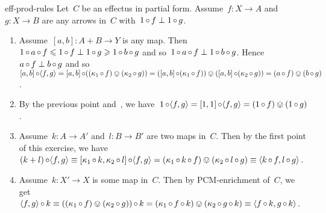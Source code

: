 \begin{solution}{eff-prod-rules}%
   Let~$C$ be an effectus in partial form.
Assume~$f\colon X \to A$ and~$g\colon X \to B$
    are any arrows in~$C$ with~$1 \mathop{\circ} f \perp 1 \mathop{\circ} g$.
\begin{enumerate}
\item Assume~$[a,b]\colon A+B \to Y$ is any map.
Then~$1 \mathop{\circ} a \mathop{\circ} f \leqslant 1 \mathop{\circ} f \perp 1 \mathop{\circ} g
        \geqslant 1 \mathop{\circ} b \mathop{\circ} g$
        and so~$1 \mathop{\circ} a \mathop{\circ} f \perp 1 \mathop{\circ} b \mathop{\circ} g$.
    Hence~$a \mathop{\circ} f \perp b \mathop{\circ} g$
    and so~$[a,b] \mathop{\circ} \langle f, g \rangle
        = [a,b] \mathop{\circ} ((\kappa_1 \mathop{\circ} f) \ovee (\kappa_2 \mathop{\circ} g))
        = ([a,b] \mathop{\circ} (\kappa_1 \mathop{\circ} f)) \ovee ([a,b] \mathop{\circ} (\kappa_2 \mathop{\circ} g)) = (a \mathop{\circ} f) \ovee (b \mathop{\circ} g)$.
\item By the previous point and~,
        we have~$1 \mathop{\circ} \langle f,g\rangle
            = [1,1] \mathop{\circ} \langle f,g\rangle
            = (1 \mathop{\circ} f) \ovee (1 \mathop{\circ} g)$.
\item Assume~$k\colon A \to A'$ and~$l \colon B \to B'$ are two maps in~$C$.
    Then by the first point of this exercise,
            we have~$(k+l) \mathop{\circ} \langle f, g\rangle
                \equiv [\kappa_1 \mathop{\circ} k, \kappa_2 \mathop{\circ} l] \mathop{\circ}
                    \langle f, g \rangle 
                = (\kappa_1 \mathop{\circ} k \mathop{\circ} f) \ovee
                (\kappa_2 \mathop{\circ} l \mathop{\circ} g) \equiv \langle 
                k \mathop{\circ} f, l \mathop{\circ} g \rangle $.
\item
Assume~$k\colon X' \to X$ is some map in~$C$.
Then by PCM-enrichment of~$C$, we
    get~$\langle f, g \rangle \mathop{\circ} k 
        \equiv ((\kappa_1 \mathop{\circ} f) \ovee (\kappa_2 \mathop{\circ} g)) \mathop{\circ} k
        = (\kappa_1 \mathop{\circ} f\mathop{\circ} k) \ovee (\kappa_2 \mathop{\circ} g \mathop{\circ} k)
        \equiv \langle f \mathop{\circ} k, g\mathop{\circ} k\rangle$.
\end{enumerate}
\end{solution}
\spacingfix{}

